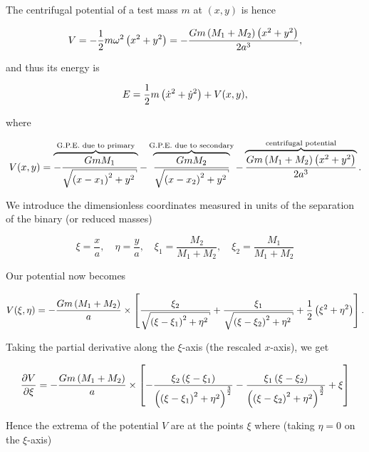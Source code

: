 The centrifugal potential of a test mass $m$ at $(x,y)$ is hence

\begin{equation}
    V = -\frac12 m\omega^2\left(x^2+y^2\right) = -\frac{Gm\left(M_1+M_2\right)\left(x^2+y^2\right)}{2a^3},
\end{equation}

and thus its energy is

\begin{equation}
    E = \frac12 m\left(\dot{x}^2+\dot{y}^2\right) + V(x,y),
\end{equation}

where

\begin{equation}
    V(x,y) = \overbrace{-\frac{GmM_1}{\sqrt{\pqty{x-x_1}^2+y^2}}}^\text{G.P.E. due to primary}-\overbrace{\frac{GmM_2}{\sqrt{\pqty{x-x_2}^2+y^2}}}^\text{G.P.E. due to secondary}-\overbrace{\frac{Gm\pqty{M_1+M_2}\pqty{x^2+y^2}}{2a^3}}^\text{centrifugal potential}.
\end{equation}

We introduce the dimensionless coordinates measured in units of the separation of the binary (or reduced masses)

\begin{equation}
    \xi = \frac{x}{a},\quad\eta=\frac{y}{a},\quad\xi_1=\frac{M_2}{M_1+M_2},\quad\xi_2=\frac{M_1}{M_1+M_2}
\end{equation}

Our potential now becomes

\begin{equation}
    V(\xi,\eta) = -\frac{Gm\pqty{M_1+M_2}}{a}\times\bqty{\frac{\xi_2}{\sqrt{\pqty{\xi-\xi_1}^2+\eta^2}}+\frac{\xi_1}{\sqrt{\pqty{\xi-\xi_2}^2+\eta^2}}+\frac12\pqty{\xi^2+\eta^2}}.
\end{equation}

Taking the partial derivative along the $\xi$-axis (the rescaled $x$-axis), we get

\begin{equation}
    \pdv{V}{\xi} = -\frac{Gm\pqty{M_1+M_2}}{a}\times\bqty{-\frac{\xi_2\pqty{\xi-\xi_1}}{\pqty{\pqty{\xi-\xi_1}^2+\eta^2}^\frac32}-\frac{\xi_1\pqty{\xi-\xi_2}}{\pqty{\pqty{\xi-\xi_2}^2+\eta^2}^\frac32}+\xi}\label{eq:pdv_of_roche_potential}
\end{equation}

Hence the extrema of the potential $V$ are at the points $\xi$ where (taking $\eta=0$ on the $\xi$-axis)


